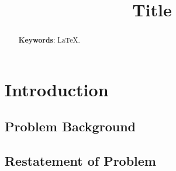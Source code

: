 \documentclass[12pt]{article}  %
\title{Title}  %
\begin{document}
\begin{abstract}
















    \vspace{5pt}
    \textbf{Keywords}: \LaTeX.
\end{abstract}

\maketitle  %
\tableofcontents  %






\section{Introduction}
\subsection{Problem Background}
\subsection{Restatement of Problem}
\end{document}
